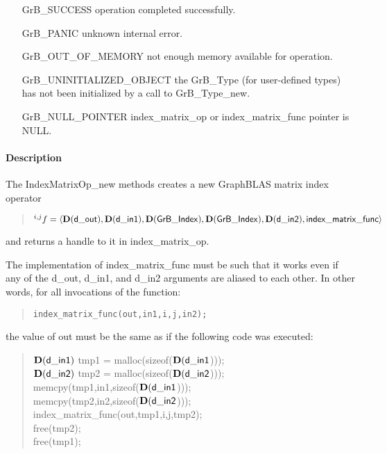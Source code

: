 \begin{itemize}[leftmargin=2.1in]
\item[{\sf GrB\_SUCCESS}]           operation completed successfully.
\item[{\sf GrB\_PANIC}]             unknown internal error.
\item[{\sf GrB\_OUT\_OF\_MEMORY}]          not enough memory available for operation.
\item[{\sf GrB\_UNINITIALIZED\_OBJECT}]          the {\sf GrB\_Type} (for user-defined types)
                                    has not been initialized by a call to {\sf GrB\_Type\_new}.
\item[{\sf GrB\_NULL\_POINTER}]    {\sf index\_matrix\_op} or {\sf index\_matrix\_func} pointer is {\sf NULL}.

\end{itemize}

\paragraph{Description}

The {\sf IndexMatrixOp\_new} methods creates a new GraphBLAS matrix index operator
\begin{quote}
$^{i,j}f = \langle \mathbf{D}({\sf d\_out}), \mathbf{D}({\sf d\_in1}), \mathbf{D}({\sf GrB\_Index}), \mathbf{D}({\sf GrB\_Index}), \mathbf{D}({\sf d\_in2}), {\sf index\_matrix\_func} \rangle$
\end{quote}
and returns a handle to it in {\sf index\_matrix\_op}.

The implementation of {\sf index\_matrix\_func} must be such that it works
even if any of the {\sf d\_out}, {\sf d\_in1}, and {\sf d\_in2} arguments are aliased to each other.
In other words, for all invocations of the function:
\begin{quote}
\begin{verbatim}
index_matrix_func(out,in1,i,j,in2);
\end{verbatim}
\end{quote}
the value of {\sf out} must be the same as if the following code
was executed:

\begin{quote}
\begin{code}
    $\mathbf{D}({\sf d\_in1})$ tmp1 = malloc(sizeof($\mathbf{D}({\sf d\_in1}$))); \\
    $\mathbf{D}({\sf d\_in2})$ tmp2 = malloc(sizeof($\mathbf{D}({\sf d\_in2}$))); \\
    memcpy(tmp1,in1,sizeof($\mathbf{D}({\sf d\_in1}$))); \\
    memcpy(tmp2,in2,sizeof($\mathbf{D}({\sf d\_in2}$))); \\
    index\_matrix\_func(out,tmp1,i,j,tmp2); \\
    free(tmp2); \\
    free(tmp1);
\end{code}
\end{quote}

